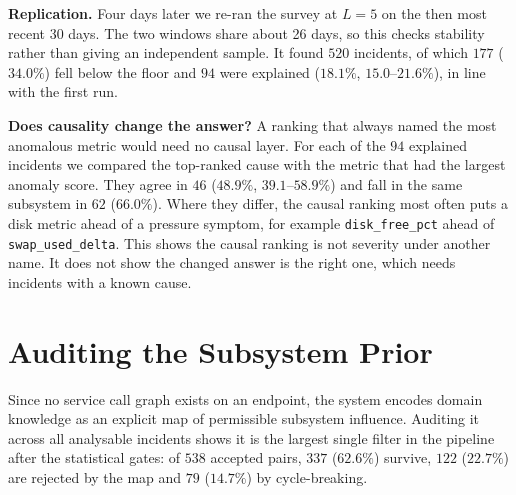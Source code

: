 \documentclass[conference,a4paper]{IEEEtran}
\begin{document}
\textbf{Replication.} Four days later we re-ran the survey at $L=5$ on the
then most recent 30 days. The two windows share about 26 days, so this checks
stability rather than giving an independent sample. It found $520$
incidents, of which $177$ ($34.0\%$) fell below the floor and $94$ were
explained ($18.1\%$, $15.0$--$21.6\%$), in line with the first run.

\textbf{Does causality change the answer?} A ranking that always named the
most anomalous metric would need no causal layer. For each of the $94$
explained incidents we compared the top-ranked cause with the metric that had
the largest anomaly score. They agree in $46$ ($48.9\%$, $39.1$--$58.9\%$)
and fall in the same subsystem in $62$ ($66.0\%$). Where they differ, the
causal ranking most often puts a disk metric ahead of a pressure symptom, for
example \texttt{disk\_free\_pct} ahead of \texttt{swap\_used\_delta}.
This shows the causal ranking is not severity under another name. It does not
show the changed answer is the right one, which needs incidents with a known
cause.

\section{Auditing the Subsystem Prior}
\label{sec:topology}

Since no service call graph exists on an endpoint, the system encodes domain
knowledge as an explicit map of permissible subsystem influence. Auditing it
across all analysable incidents shows it is the largest single filter in the
pipeline after the statistical gates: of $538$ accepted pairs, $337$
($62.6\%$) survive, $122$ ($22.7\%$) are rejected by the map and $79$
($14.7\%$) by cycle-breaking.
\end{document}
